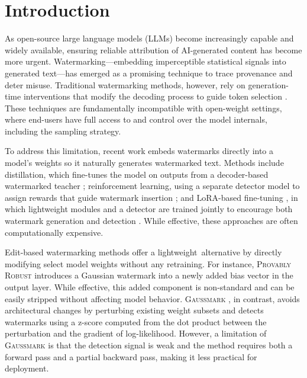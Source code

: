 \section{Introduction}

As open-source large language models (LLMs) become increasingly capable and widely available, ensuring reliable attribution of AI-generated content has become more urgent. Watermarking—embedding imperceptible statistical signals into generated text—has emerged as a promising technique to trace provenance and deter misuse. Traditional watermarking methods, however, rely on generation-time interventions that modify the decoding process to guide token selection \cite{kirchenbauer2023watermark}. These techniques are fundamentally incompatible with open-weight settings, where end-users have full access to and control over the model internals, including the sampling strategy.

To address this limitation, recent work embeds watermarks directly into a model's weights so it naturally generates watermarked text. Methods include distillation, which fine-tunes the model on outputs from a decoder-based watermarked teacher \cite{gu2023learnability}; reinforcement learning, using a separate detector model to assign rewards that guide watermark insertion \cite{xu2024learningwatermarkllmgeneratedtext}; and LoRA-based fine-tuning \cite{hu2022lora}, in which lightweight modules and a detector are trained jointly to encourage both watermark generation and detection \cite{elhassan2025can}. While effective, these approaches are often computationally expensive.

Edit-based watermarking methods offer a lightweight alternative by directly modifying select model weights without any retraining. For instance, \textsc{Provably Robust} \cite{christ2024provably} introduces a Gaussian watermark into a newly added bias vector in the output layer. While effective, this added component is non-standard and can be easily stripped without affecting model behavior. \textsc{Gaussmark} \cite{block2025gaussmark}, in contrast, avoids architectural changes by perturbing existing weight subsets and detects watermarks using a z-score computed from the dot product between the perturbation and the gradient of log-likelihood. However, a limitation of \textsc{Gaussmark} is that the detection signal is weak and the method requires both a forward pass and a partial backward pass, making it less practical for deployment.

